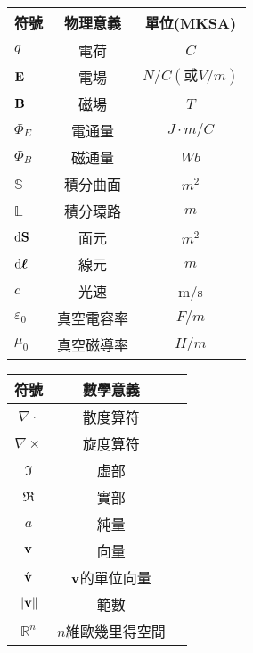 \begin{table}[!htbp]
    \centering
    \begin{tabular}{lcc}
        \toprule
        符號                     & 物理意義   & 單位(MKSA)           \\
        \midrule
        $q$                      & 電荷       & $\unit{C}$           \\
        $\mathbf{E}$                 & 電場       & $\unit{N/C(或V/m)}$  \\
        $\mathbf{B}$                 & 磁場       & $\unit{T}$           \\
        $\Phi_E$                 & 電通量     & $\unit{J\cdot m /C}$ \\
        $\Phi_B$                 & 磁通量     & $\unit{Wb}$          \\
        $\mathbb{S}$             & 積分曲面   & $\unit{m^2}$         \\
        $\mathbb{L}$             & 積分環路   & $\unit{m}$           \\
        $\mathop{}\!\mathrm{d} \mathbf{S}$            & 面元       & $\unit{m^2}$         \\
        $\mathop{}\!\mathrm{d} \boldsymbol{\ell}$ & 線元       & $\unit{m}$           \\
        $c$                      & 光速       & m/s                  \\
        $\varepsilon_0$          & 真空電容率 & $\unit{F/m}$         \\
        $\mu_0$                  & 真空磁導率 & $\unit{H/m}$         \\
        \bottomrule
    \end{tabular}
\end{table}

\begin{table}[!htbp]
    \centering
    \begin{tabular}{ccc}
        \toprule
        符號            & 數學意義           \\
        \midrule
        $\nabla \cdot$  & 散度算符           \\
        $\nabla \times$ & 旋度算符           \\
        $\Im$           & 虛部               \\
        $\Re$           & 實部               \\
        $a$             & 純量               \\
        $\mathbf{v}$        & 向量               \\
        $\hat{\mathbf{v}}$        & $\mathbf{v}$的單位向量 \\
        $\left\|\mathbf{v}\right\|$ & 範數               \\
        $\mathbb{R}^n$  & $n$維歐幾里得空間  \\
        \bottomrule
    \end{tabular}
\end{table}
